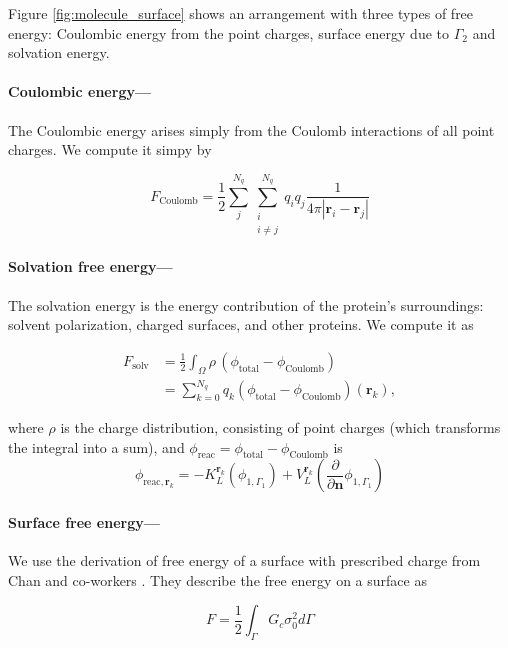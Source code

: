 
Figure \ref{fig:molecule_surface} shows an arrangement with three types of free energy: Coulombic energy from the point charges, surface energy due to $\Gamma_2$ and solvation energy. 

\medskip

\paragraph*{Coulombic energy---}

The Coulombic energy arises simply from the Coulomb interactions of all point charges. We compute it simpy by

\begin{equation} \label{eq:coul_energy}
F_\text{Coulomb} = \frac{1}{2} \sum_j^{N_q}\sum^{N_q}_{\substack{i\\ i\neq j}} q_iq_j\frac{1}{4\pi |\mathbf{r}_i-\mathbf{r}_j|}
\end{equation}

\paragraph*{Solvation free energy---}

The solvation energy is the energy contribution of the protein's surroundings: solvent polarization, charged surfaces, and other proteins. We compute it as

\begin{align} \label{eq:solv_energy}
F_{\text{solv}} &= \frac{1}{2} \int_{\Omega} \rho \,(\phi_{\text{total}} - \phi_{\text{Coulomb}}) \\
&= \sum_{k=0}^{N_q} q_k (\phi_{\text{total}} - \phi_{\text{Coulomb}})(\mathbf{r}_k),
\end{align}

\noindent where $\rho$ is the charge distribution, consisting of point charges (which transforms the integral into a sum), and $\phi_\text{reac} = \phi_{\text{total}} - \phi_{\text{Coulomb}}$ is
%
\begin{equation} \label{eq:phi_reac_bem}
\phi_{\text{reac},\mathbf{r}_k} = -K_{L}^{\mathbf{r}_k}(\phi_{1,\Gamma_1}) + V_{L}^{\mathbf{r}_k} \left(\frac{\partial}{\partial \mathbf{n}}\phi_{1,\Gamma_1} \right) 
\end{equation}

\paragraph*{Surface free energy---}

We use the derivation of free energy of a surface with prescribed charge from Chan and co-workers \cite{ChanMitchell1983,CarnieChan1993}. They describe the free energy on a surface as

\begin{equation} \label{eq:energy_surf}
F = \frac{1}{2} \int_{\Gamma} G_c \sigma_0^2 d\Gamma 
\end{equation} 
